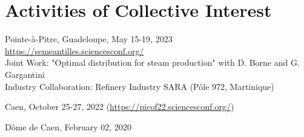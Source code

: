 \documentclass[10pt]{article} %
\begin{document}
\section{Activities of Collective Interest}

{Pointe-à-Pitre, Guadeloupe, May 15-19, 2023 \\
	\href{https://semeantilles.sciencesconf.org/}{https://semeantilles.sciencesconf.org/}\\
	Joint Work: "Optimal distribution for steam production" with D. Borne and G. Gargantini\\
	Industry Collaboration: Refinery Industry SARA (Pôle 972, Martinique)}


{Caen, October 25-27, 2022 (\href{https://picof22.sciencesconf.org/}{https://picof22.sciencesconf.org/})}

{Dôme de Caen, February 02, 2020}



\nocite{*} %

\end{document}
